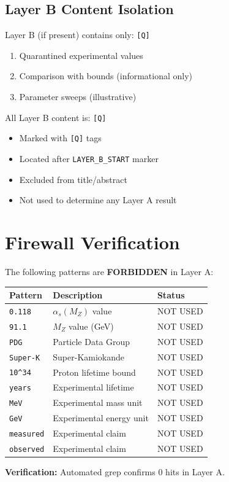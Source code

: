 \documentclass[11pt,a4paper]{article}
\newcommand{\tagQ}{\textcolor{red!70!black}{\texttt{[Q]}}}
\theoremstyle{definition}
\begin{document}
\subsection{Layer B Content Isolation}
\label{subsec:layer-b-isolation}

Layer B (if present) contains only: \tagQ{}
\begin{enumerate}
  \item Quarantined experimental values
  \item Comparison with bounds (informational only)
  \item Parameter sweeps (illustrative)
\end{enumerate}

All Layer B content is: \tagQ{}
\begin{itemize}
  \item Marked with \tagQ{} tags
  \item Located after \texttt{LAYER\_B\_START} marker
  \item Excluded from title/abstract
  \item Not used to determine any Layer A result
\end{itemize}

\section{Firewall Verification}
\label{sec:firewall}

\begin{forbiddenbox}
The following patterns are \textbf{FORBIDDEN} in Layer A:

\begin{center}
\begin{tabular}{lll}
\toprule
Pattern & Description & Status \\
\midrule
\texttt{0.118} & $\alpha_s(M_Z)$ value & NOT USED \\
\texttt{91.1} & $M_Z$ value (GeV) & NOT USED \\
\texttt{PDG} & Particle Data Group & NOT USED \\
\texttt{Super-K} & Super-Kamiokande & NOT USED \\
\texttt{10\^{}34} & Proton lifetime bound & NOT USED \\
\texttt{years} & Experimental lifetime & NOT USED \\
\texttt{MeV} & Experimental mass unit & NOT USED \\
\texttt{GeV} & Experimental energy unit & NOT USED \\
\texttt{measured} & Experimental claim & NOT USED \\
\texttt{observed} & Experimental claim & NOT USED \\
\bottomrule
\end{tabular}
\end{center}

\textbf{Verification:} Automated grep confirms 0 hits in Layer A.
\end{forbiddenbox}
\end{document}
